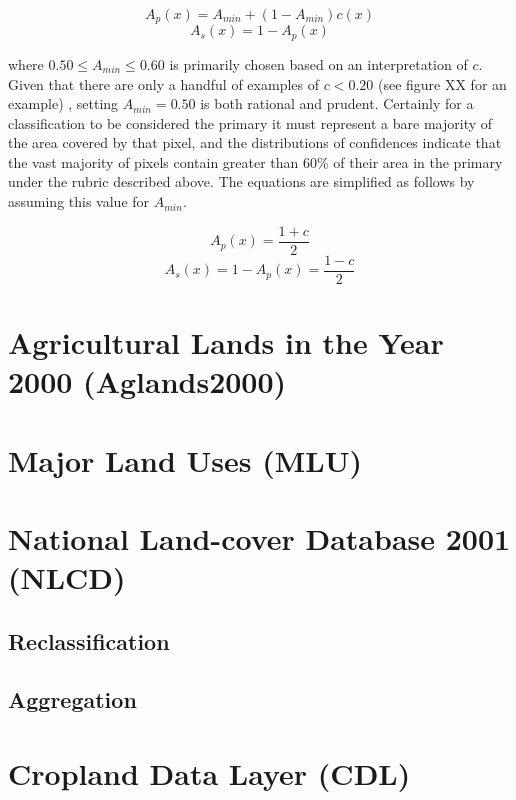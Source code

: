 $$
A_p(x) = A_{min} + (1 - A_{min}) c(x)
$$
$$
A_s(x) = 1 - A_p(x)
$$

where $0.50 \le A_{min} \le 0.60$ is primarily chosen based on an
interpretation of $c$.  Given that there are only a handful of
examples of $c < 0.20$ (see figure XX for an example) , setting $A_{min} =
0.50$ is both rational and prudent.  Certainly for a classification to
be considered the primary it must represent a bare majority of the
area covered by that pixel, and the distributions of confidences
indicate that the vast majority of pixels contain greater than 60\% of
their area in the primary under the rubric described above. The
equations are simplified as follows by assuming this value for
$A_{min}$.

$$
A_p(x) = \dfrac{1 + c}{2}
$$
$$
A_s(x) = 1 - A_p(x) = \dfrac{1-c}{2}
$$


\section{Agricultural Lands in the Year 2000 (Aglands2000)}
\label{sec:aglands2000}

\section{Major Land Uses (MLU)}
\label{sec:mlu}


\section{National Land-cover Database 2001 (NLCD)}
\label{sec:nlcd}

\subsection{Reclassification}
\label{sec:nlcd-reclass}


\subsection{Aggregation}
\label{sec:nlcd-aggr}


\section{Cropland Data Layer (CDL)}
\label{sec:cdl}


